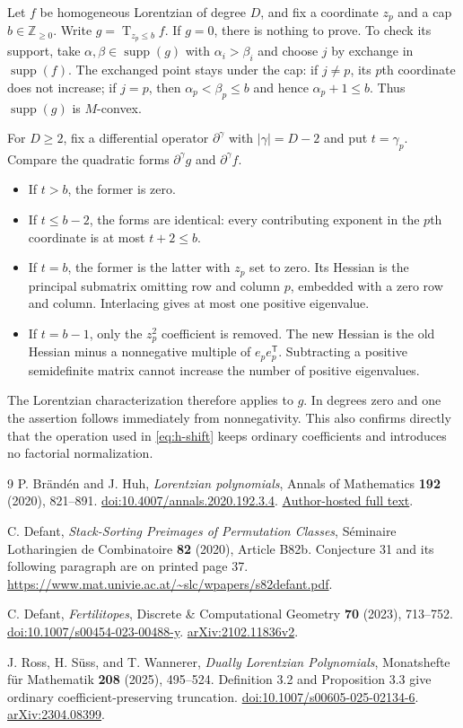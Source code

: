 \documentclass[11pt,letterpaper]{article}
\theoremstyle{definition}
\theoremstyle{remark}
\newcommand{\NN}{\mathbb{Z}_{\geq 0}}
\newcommand{\supp}{\operatorname{supp}}
\newcommand{\Tr}{\operatorname{T}}
\begin{document}
Let $f$ be homogeneous Lorentzian of degree $D$, and fix a coordinate $z_p$ and a cap $b\in\NN$. Write $g=\Tr_{z_p\leq b}f$. If $g=0$, there is nothing to prove. To check its support, take $\alpha,\beta\in\supp(g)$ with $\alpha_i>\beta_i$ and choose $j$ by exchange in $\supp(f)$. The exchanged point stays under the cap: if $j\neq p$, its $p$th coordinate does not increase; if $j=p$, then $\alpha_p<\beta_p\leq b$ and hence $\alpha_p+1\leq b$. Thus $\supp(g)$ is $M$-convex.

For $D\geq2$, fix a differential operator $\partial^\gamma$ with $|\gamma|=D-2$ and put $t=\gamma_p$. Compare the quadratic forms $\partial^\gamma g$ and $\partial^\gamma f$.
\begin{itemize}
 \item If $t>b$, the former is zero.
 \item If $t\leq b-2$, the forms are identical: every contributing exponent in the $p$th coordinate is at most $t+2\leq b$.
 \item If $t=b$, the former is the latter with $z_p$ set to zero. Its Hessian is the principal submatrix omitting row and column $p$, embedded with a zero row and column. Interlacing gives at most one positive eigenvalue.
 \item If $t=b-1$, only the $z_p^2$ coefficient is removed. The new Hessian is the old Hessian minus a nonnegative multiple of $e_pe_p^{\mathsf T}$. Subtracting a positive semidefinite matrix cannot increase the number of positive eigenvalues.
\end{itemize}
The Lorentzian characterization therefore applies to $g$. In degrees zero and one the assertion follows immediately from nonnegativity. This also confirms directly that the operation used in \eqref{eq:h-shift} keeps ordinary coefficients and introduces no factorial normalization.

\begin{thebibliography}{9}
P. Br\"and\'en and J. Huh,
\emph{Lorentzian polynomials},
Annals of Mathematics \textbf{192} (2020), 821--891.
\href{https://doi.org/10.4007/annals.2020.192.3.4}{doi:10.4007/annals.2020.192.3.4}.
\href{https://web.math.princeton.edu/~huh/Lorentzian.pdf}{Author-hosted full text}.

C. Defant,
\emph{Stack-Sorting Preimages of Permutation Classes},
S\'eminaire Lotharingien de Combinatoire \textbf{82} (2020), Article B82b.
Conjecture 31 and its following paragraph are on printed page 37.
\url{https://www.mat.univie.ac.at/~slc/wpapers/s82defant.pdf}.

C. Defant,
\emph{Fertilitopes},
Discrete \& Computational Geometry \textbf{70} (2023), 713--752.
\href{https://doi.org/10.1007/s00454-023-00488-y}{doi:10.1007/s00454-023-00488-y}.
\href{https://arxiv.org/html/2102.11836v2}{arXiv:2102.11836v2}.

J. Ross, H. S\"uss, and T. Wannerer,
\emph{Dually Lorentzian Polynomials},
Monatshefte f\"ur Mathematik \textbf{208} (2025), 495--524.
Definition 3.2 and Proposition 3.3 give ordinary coefficient-preserving truncation.
\href{https://doi.org/10.1007/s00605-025-02134-6}{doi:10.1007/s00605-025-02134-6}.
\href{https://arxiv.org/pdf/2304.08399}{arXiv:2304.08399}.
\end{thebibliography}
\end{document}
